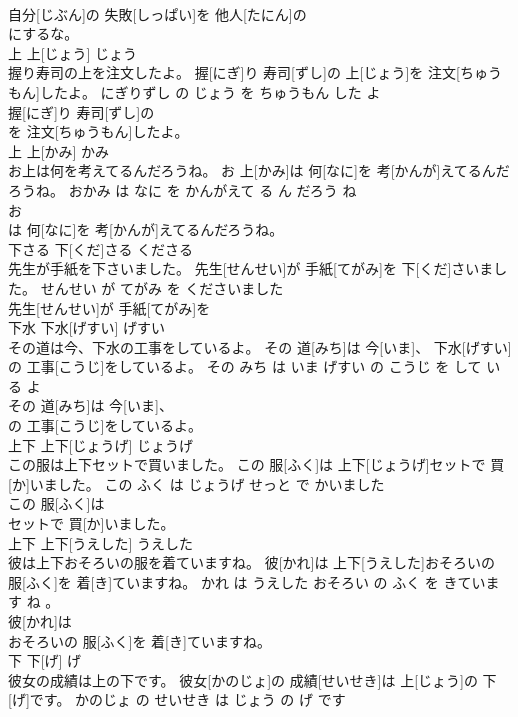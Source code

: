\documentclass[8pt]{extreport}
\begin{document}
\begin{CJK}{UTF8}{min}
\\	自分[じぶん]の 失敗[しっぱい]を 他人[たにん]の
\\	にするな。			
\\	上	上[じょう]	じょう	
\\	握り寿司の上を注文したよ。	握[にぎ]り 寿司[ずし]の 上[じょう]を 注文[ちゅうもん]したよ。	にぎりずし の じょう を ちゅうもん した よ	
\\	握[にぎ]り 寿司[ずし]の
\\	を 注文[ちゅうもん]したよ。			
\\	上	上[かみ]	かみ	
\\	お上は何を考えてるんだろうね。	お 上[かみ]は 何[なに]を 考[かんが]えてるんだろうね。	おかみ は なに を かんがえて る ん だろう ね	
\\	お
\\	は 何[なに]を 考[かんが]えてるんだろうね。			
\\	下さる	下[くだ]さる	くださる	
\\	先生が手紙を下さいました。	先生[せんせい]が 手紙[てがみ]を 下[くだ]さいました。	せんせい が てがみ を くださいました	
\\	先生[せんせい]が 手紙[てがみ]を
\\	下水	下水[げすい]	げすい	
\\	その道は今、下水の工事をしているよ。	その 道[みち]は 今[いま]、 下水[げすい]の 工事[こうじ]をしているよ。	その みち は いま げすい の こうじ を して いる よ	
\\	その 道[みち]は 今[いま]、
\\	の 工事[こうじ]をしているよ。			
\\	上下	上下[じょうげ]	じょうげ	
\\	この服は上下セットで買いました。	この 服[ふく]は 上下[じょうげ]セットで 買[か]いました。	この ふく は じょうげ せっと で かいました	
\\	この 服[ふく]は
\\	セットで 買[か]いました。			
\\	上下	上下[うえした]	うえした	
\\	彼は上下おそろいの服を着ていますね。	彼[かれ]は 上下[うえした]おそろいの 服[ふく]を 着[き]ていますね。	かれ は うえした おそろい の ふく を きています ね 。	
\\	彼[かれ]は
\\	おそろいの 服[ふく]を 着[き]ていますね。			
\\	下	下[げ]	げ	
\\	彼女の成績は上の下です。	彼女[かのじょ]の 成績[せいせき]は 上[じょう]の 下[げ]です。	かのじょ の せいせき は じょう の げ です	

\end{CJK}
\end{document}
